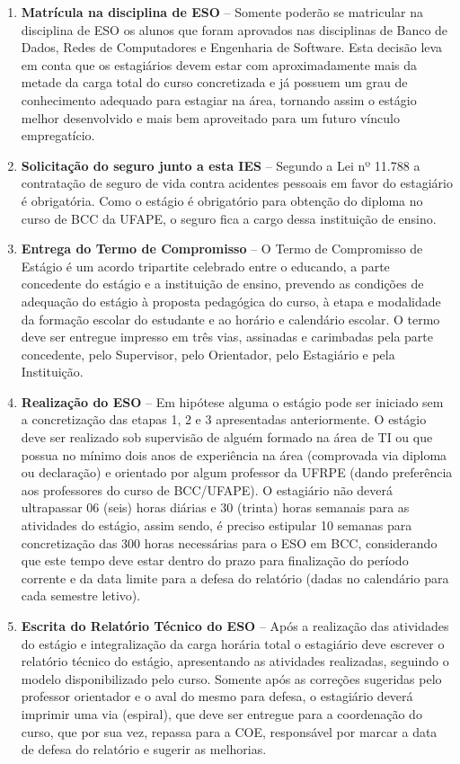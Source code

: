 \documentclass[
	12pt,				%
	openright,			%
  oneside,     %
	a4paper,			%
	english,			%
	french,				%
	spanish,			%
	brazil				%
	]{abntex2}
\begin{document}
\begin{enumerate}
    \item \textbf{Matrícula na disciplina de ESO} – Somente poderão se matricular na disciplina de ESO os alunos que foram aprovados nas disciplinas de Banco de Dados, Redes de Computadores e Engenharia de Software. Esta decisão leva em conta que os estagiários devem estar com aproximadamente mais da metade da carga total do curso concretizada e já possuem um grau de conhecimento adequado para estagiar na área, tornando assim o estágio melhor desenvolvido e mais bem aproveitado para um futuro vínculo empregatício.
    \item \textbf{Solicitação do seguro junto a esta IES} – Segundo a Lei nº 11.788 a contratação de seguro de vida contra acidentes pessoais em favor do estagiário é obrigatória. Como o estágio é obrigatório para obtenção do diploma no curso de BCC da UFAPE, o seguro fica a cargo dessa instituição de ensino.
    \item \textbf{Entrega do Termo de Compromisso} – O Termo de Compromisso de Estágio é um acordo tripartite celebrado entre o educando, a parte concedente do estágio e a instituição de ensino, prevendo as condições de adequação do estágio à proposta pedagógica do  curso, à etapa e modalidade da formação escolar  do  estudante  e ao horário e calendário escolar. O termo deve ser entregue impresso em três vias, assinadas e carimbadas pela parte concedente, pelo  Supervisor,  pelo  Orientador, pelo Estagiário e pela Instituição.
    \item \textbf{Realização do ESO} – Em hipótese alguma o estágio pode ser iniciado sem a concretização das etapas 1, 2 e 3 apresentadas anteriormente. O estágio deve ser realizado sob supervisão de alguém formado na área de TI ou que possua no mínimo dois anos de experiência na área (comprovada via diploma ou declaração) e orientado por algum professor da UFRPE (dando preferência aos professores do curso de BCC/UFAPE). O estagiário não deverá ultrapassar 06 (seis) horas diárias e 30 (trinta) horas semanais para as atividades do estágio, assim sendo, é preciso estipular 10 semanas para concretização das 300 horas necessárias para o ESO em BCC, considerando que este tempo deve estar dentro do prazo para finalização do período corrente e da data limite para a defesa do relatório (dadas no calendário para cada semestre letivo).
    \item \textbf{Escrita do Relatório Técnico do ESO} – Após a realização das atividades do estágio e integralização da carga horária total o estagiário deve escrever o relatório técnico do estágio, apresentando as atividades realizadas, seguindo o modelo disponibilizado pelo curso. Somente após as correções sugeridas pelo professor orientador e o aval do mesmo para defesa, o estagiário deverá imprimir uma via (espiral), que deve ser entregue para a coordenação do curso, que por sua vez, repassa para a COE, responsável por marcar a data de defesa do relatório e sugerir as melhorias.

\end{enumerate}
\end{document}
